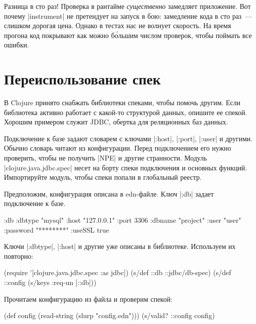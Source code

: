 Разница в сто раз! Проверка в рантайме \emph{существенно} замедляет приложение.
Вот почему \spverb|instrument| не претендует на запуск в бою: замедление кода в
сто раз~--- слишком дорогая цена. Однако в тестах нас не волнует скорость. На
время прогона код покрывают как можно б\'{о}льшим числом проверок, чтобы поймать
все ошибки.

\section{Переиспользование спек}


В Clojure принято снабжать библиотеки спеками, чтобы помочь другим. Если
библиотека активно работает с какой-то структурой данных, опишите ее
спекой. Хорошим примером служит JDBC,
обертка для реляционных баз данных.

Подключение к базе задают словарем с ключами \spverb|:host|, \spverb|:port|,
\spverb|:user| и другими. Обычно словарь читают из конфигурации. Перед
подключением его нужно проверить, чтобы не получить \spverb|NPE| и другие
странности. Модуль \spverb|clojure.java.jdbc.spec| несет на борту спеки
подключения и основных функций. Импортируйте модуль, чтобы спеки попали в
глобальный реестр.

Предположим, конфигурация описана в edn-файле. Ключ \spverb|:db| задает
подключение к базе.

\begin{english}
  \begin{clojure}
{:db {:dbtype "mysql"
      :host "127.0.0.1"
      :port 3306
      :dbname "project"
      :user "user"
      :password "********"
      :useSSL true}}
  \end{clojure}
\end{english}

Ключи \spverb|:dbtype|, \spverb|:host| и другие уже описаны в библиотеке.
Используем их повторно:

\begin{english}
  \begin{clojure}
(require '[clojure.java.jdbc.spec :as jdbc])
(s/def ::db ::jdbc/db-spec)
(s/def ::config (s/keys :req-un [::db]))
  \end{clojure}
\end{english}

Прочитаем конфигурацию из файла и проверим спекой:

\begin{english}
  \begin{clojure}
(def config (read-string (slurp "config.edn")))
(s/valid? ::config config)
  \end{clojure}
\end{english}

